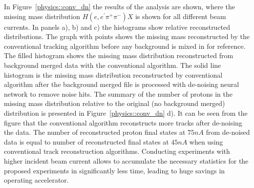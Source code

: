 In Figure~\ref{physics::conv_dn} the results of the analysis are shown, where the missing mass distribution $H(e,e^\prime\pi^+\pi^-)X$ is shown for all different beam currents. In panels a), b) and c) the histograms show relative reconstructed distributions. The graph with points shows the missing mass reconstructed by the conventional tracking algorithm before any background is mixed in for reference. The filled histogram shows the missing mass distribution reconstructed from background merged data with the conventional algorithm. The solid line histogram is the missing mass distribution reconstructed by conventional algorithm after the background merged file is processed with de-noising neural network to remove noise hits.
The summary of the number of protons in the missing mass distribution relative to the original (no background merged) distribution is presented in Figure~\ref{physics::conv_dn} d). It can be seen from the figure that the conventional algorithm reconstructs more tracks after de-noising the data. The number of reconstructed proton final states at $75nA$ from de-noised data is equal to number of reconstructed final states at $45nA$ when using conventional track reconstruction algorithms.  Conducting experiments with higher incident beam current allows to accumulate the necessary statistics for the proposed experiments in significantly less time, leading to huge savings in operating accelerator.






